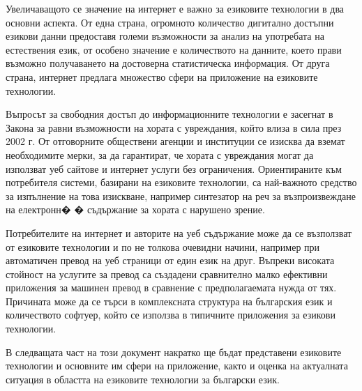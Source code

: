 \documentclass[]{../../metanetpaper}
\begin{document}
\begin{multicols}{2}
Увеличаващото се значение на интернет е важно за езиковите технологии в два основни аспекта. От една страна, огромното количество дигитално достъпни езикови данни предоставя големи възможности за анализ на употребата на естествения език, от особено значение е количеството на данните, което прави възможно получаването на достоверна статистическа информация. От друга страна, интернет предлага множество сфери на приложение на езиковите технологии. 

Въпросът за свободния достъп до информационните технологии е засегнат в Закона за равни възможности на хората с увреждания, който влиза в сила през 2002 г. От отговорните обществени агенции и институции се изисква да вземат необходимите мерки, за да гарантират, че хората с увреждания могат да използват уеб сайтове и интернет услуги без ограничения. Ориентираните към потребителя системи, базирани на езиковите технологии, са най-важното средство за изпълнение на това изискване, например синтезатор на реч за възпроизвеждане  на електронн�
 � съдържание за хората с нарушено зрение.

Потребителите на интернет и авторите на уеб съдържание може да се възползват от езиковите технологии и по не толкова очевидни начини, например при автоматичен превод на уеб страници от един език на друг. Въпреки високата стойност на услугите за превод са създадени сравнително малко ефективни приложения за машинен превод в сравнение с предполагаемата нужда от тях. Причината може да се търси в комплексната структура на българския език и количеството софтуер, който се използва в типичните приложения за езикови технологии. 

В следващата част на този документ накратко ще бъдат представени езиковите технологии и основните им сфери на приложение, както и оценка на актуалната ситуация в областта на езиковите технологии за български език. 
\end{multicols}

\clearpage


\end{document}
